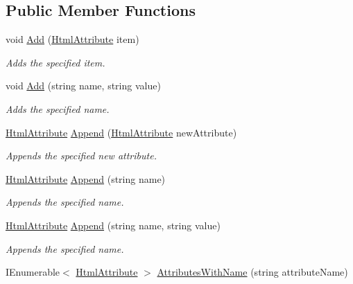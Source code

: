 \subsection*{Public Member Functions}
\begin{DoxyCompactItemize}
\item 
void \hyperlink{class_html_agility_pack_1_1_html_attribute_collection_af55dc26d57b597fbb0a11ef1c93df196}{Add} (\hyperlink{class_html_agility_pack_1_1_html_attribute}{Html\+Attribute} item)
\begin{DoxyCompactList}\small\item\em Adds the specified item. \end{DoxyCompactList}\item 
void \hyperlink{class_html_agility_pack_1_1_html_attribute_collection_a8b8eefcec035b72ed5d864f105907792}{Add} (string name, string value)
\begin{DoxyCompactList}\small\item\em Adds the specified name. \end{DoxyCompactList}\item 
\hyperlink{class_html_agility_pack_1_1_html_attribute}{Html\+Attribute} \hyperlink{class_html_agility_pack_1_1_html_attribute_collection_abb8459035cd943eefff38de0acdd534e}{Append} (\hyperlink{class_html_agility_pack_1_1_html_attribute}{Html\+Attribute} new\+Attribute)
\begin{DoxyCompactList}\small\item\em Appends the specified new attribute. \end{DoxyCompactList}\item 
\hyperlink{class_html_agility_pack_1_1_html_attribute}{Html\+Attribute} \hyperlink{class_html_agility_pack_1_1_html_attribute_collection_a390332cec44d3b400546b2683533a9db}{Append} (string name)
\begin{DoxyCompactList}\small\item\em Appends the specified name. \end{DoxyCompactList}\item 
\hyperlink{class_html_agility_pack_1_1_html_attribute}{Html\+Attribute} \hyperlink{class_html_agility_pack_1_1_html_attribute_collection_a63cde463956b1a1388ebf1375d939f4d}{Append} (string name, string value)
\begin{DoxyCompactList}\small\item\em Appends the specified name. \end{DoxyCompactList}\item 
I\+Enumerable$<$ \hyperlink{class_html_agility_pack_1_1_html_attribute}{Html\+Attribute} $>$ \hyperlink{class_html_agility_pack_1_1_html_attribute_collection_a99b74dd54d27471db627fcbb11ddc44a}{Attributes\+With\+Name} (string attribute\+Name)

\end{DoxyCompactItemize}

